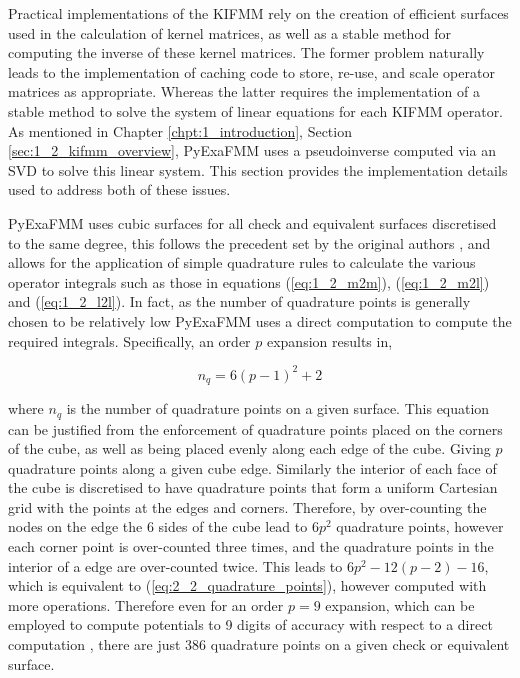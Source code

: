 Practical implementations of the \gls{KIFMM} rely on the creation of efficient
surfaces used in the calculation of kernel matrices, as well as a stable method for
computing the inverse of these kernel matrices. The former problem naturally leads
to the implementation of caching code to store, re-use, and scale operator matrices
as appropriate. Whereas the latter requires the implementation of a stable method to
solve the system of linear equations for each \gls{KIFMM} operator. As mentioned
in Chapter \ref{chpt:1_introduction}, Section \ref{sec:1_2_kifmm_overview}, \gls{PyExaFMM} uses
a pseudoinverse computed via an SVD to solve this linear system. This section
provides the implementation details used to address both of these issues.

\gls{PyExaFMM} uses cubic surfaces for all check and equivalent surfaces discretised
to the same degree, this follows the precedent set by the original authors \cite{Ying:2004:JCP}, and
allows for the application of simple quadrature rules to calculate the various
operator integrals such as those in equations (\ref{eq:1_2_m2m}), (\ref{eq:1_2_m2l})
and (\ref{eq:1_2_l2l}). In fact, as the number of quadrature points is generally
chosen to be relatively low \gls{PyExaFMM} uses a direct computation to
compute the required integrals. Specifically, an order $p$ expansion results in,

\begin{equation}
    n_q =  6(p-1)^2 + 2
    \label{eq:2_2_quadrature_points}
\end{equation}

where $n_q$ is the number of quadrature points on a given surface. This equation can be
justified from the enforcement of quadrature points placed on the corners
of the cube, as well as being placed evenly along each edge of the cube. Giving
$p$ quadrature points along a given cube edge. Similarly the interior of each
face of the cube is discretised to have quadrature points that form
a uniform Cartesian grid with the points at the edges and corners. Therefore,
by over-counting the nodes on the edge the 6 sides of the cube lead to $6p^2$ quadrature
points, however each corner point is over-counted three times, and the quadrature points
in the interior of a edge are over-counted twice. This leads to $6p^2 - 12(p-2) - 16$,
which is equivalent to (\ref{eq:2_2_quadrature_points}), however computed with more operations.
Therefore even for an order $p=9$ expansion, which can be employed to compute
potentials to 9 digits of accuracy with respect to a direct computation
\cite{Malhotra:2015:CCP}, there are just 386 quadrature points on a given check
or equivalent surface.

